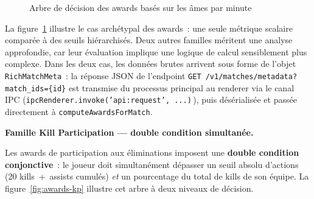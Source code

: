 \documentclass[12pt,a4paper]{article}
\begin{document}
\begin{figure}[htbp]
  \centering
  \caption{Arbre de décision des awards basés sur les âmes par minute}
  \label{fig:awards-tree}
\end{figure}

La figure~\ref{fig:awards-tree} illustre le cas archétypal des awards~: une seule métrique scalaire comparée à des seuils hiérarchisés. Deux autres familles méritent une analyse approfondie, car leur évaluation implique une logique de calcul sensiblement plus complexe. Dans les deux cas, les données brutes arrivent sous forme de l'objet \texttt{RichMatchMeta}~: la réponse JSON de l'endpoint \texttt{GET /v1/matches/metadata?match\_ids=\{id\}} est transmise du processus principal au renderer via le canal IPC (\texttt{ipcRenderer.invoke('api:request', ...)}\,), puis désérialisée et passée directement à \texttt{computeAwardsForMatch}.

\medskip\textbf{Famille Kill Participation --- double condition simultanée.}

Les awards de participation aux éliminations imposent une \textbf{double condition conjonctive}~: le joueur doit simultanément dépasser un seuil absolu d'actions (20 kills~+~assists cumulés) \textit{et} un pourcentage du total de kills de son équipe. La figure~\ref{fig:awards-kp} illustre cet arbre à deux niveaux de décision.
\end{document}
